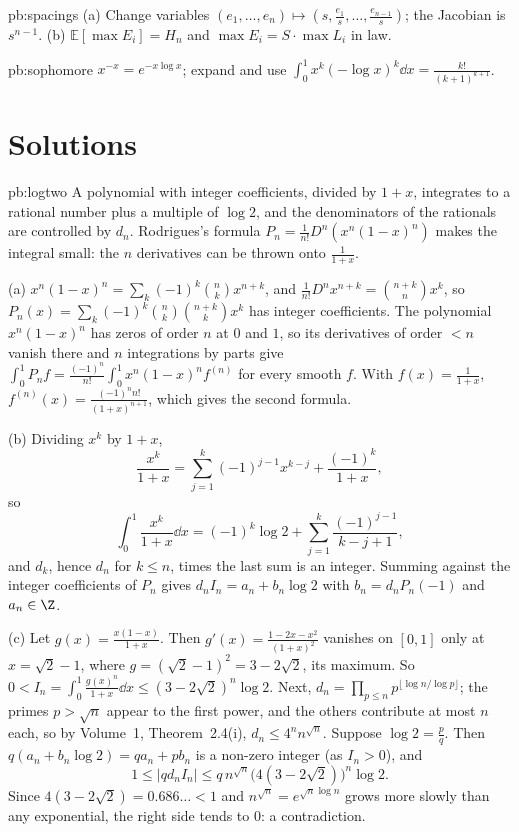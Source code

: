 \begin{hint}{pb:spacings}
(a) Change variables $(e_1,\dots,e_n)\mapsto(s,\frac{e_1}s,\dots,\frac{e_{n-1}}s)$; the Jacobian is $s^{n-1}$. (b) $\mathbb E[\max E_i]=H_n$ and
$\max E_i=S\cdot\max L_i$ in law.
\end{hint}

\begin{hint}{pb:sophomore}
$x^{-x}=e^{-x\log x}$; expand and use $\int_0^1x^k(-\log x)^k\dd x=\frac{k!}{(k+1)^{k+1}}$.
\end{hint}

\section{Solutions}

\begin{solution}{pb:logtwo}
\idea A polynomial with integer coefficients, divided by $1+x$, integrates to a rational number plus a multiple of $\log2$, and
the denominators of the rationals are controlled by $d_n$. Rodrigues's formula $P_n=\frac1{n!}D^n(x^n(1-x)^n)$ makes the integral small:
the $n$ derivatives can be thrown onto $\frac1{1+x}$.

\writeup (a) $x^n(1-x)^n=\sum_k(-1)^k\binom nkx^{n+k}$, and $\frac1{n!}D^nx^{n+k}=\binom{n+k}nx^k$, so $P_n(x)=\sum_k(-1)^k\binom nk\binom{n+k}kx^k$ has integer
coefficients. The polynomial $x^n(1-x)^n$ has zeros of order $n$ at $0$ and $1$, so its derivatives of order $<n$ vanish there and $n$
integrations by parts give $\int_0^1P_nf=\frac{(-1)^n}{n!}\int_0^1x^n(1-x)^nf^{(n)}$ for every smooth $f$. With $f(x)=\frac1{1+x}$,
$f^{(n)}(x)=\frac{(-1)^nn!}{(1+x)^{n+1}}$, which gives the second formula.

(b) Dividing $x^k$ by $1+x$,
\[
\frac{x^k}{1+x}=\sum_{j=1}^k(-1)^{j-1}x^{k-j}+\frac{(-1)^k}{1+x},
\]
so
\[
\int_0^1\frac{x^k}{1+x}\dd x=(-1)^k\log2+\sum_{j=1}^k\frac{(-1)^{j-1}}{k-j+1},
\]
and $d_k$, hence $d_n$ for $k\le n$, times the last sum is an integer. Summing against the integer coefficients of $P_n$ gives
$d_nI_n=a_n+b_n\log2$ with $b_n=d_nP_n(-1)$ and $a_n\in\Z$.

(c) Let $g(x)=\frac{x(1-x)}{1+x}$. Then $g'(x)=\frac{1-2x-x^2}{(1+x)^2}$ vanishes on $[0,1]$ only at $x=\sqrt2-1$, where $g=(\sqrt2-1)^2=3-2\sqrt2$, its
maximum. So $0<I_n=\int_0^1\frac{g(x)^n}{1+x}\dd x\le(3-2\sqrt2)^n\log2$. Next, $d_n=\prod_{p\le n}p^{\lfloor\log n/\log p\rfloor}$; the primes $p>\sqrt n$ appear
to the first power, and the others contribute at most $n$ each, so by Volume~1, Theorem~2.4(i), $d_n\le4^nn^{\sqrt n}$. Suppose
$\log2=\frac pq$. Then $q(a_n+b_n\log2)=qa_n+pb_n$ is a non-zero integer (as $I_n>0$), and
\[
1\le|qd_nI_n|\le q\,n^{\sqrt n}\bigl(4(3-2\sqrt2)\bigr)^n\log2.
\]
Since $4(3-2\sqrt2)=0.686\ldots<1$ and $n^{\sqrt n}=e^{\sqrt n\log n}$ grows more slowly than any exponential, the right side tends to $0$:
a contradiction.


\end{solution}
